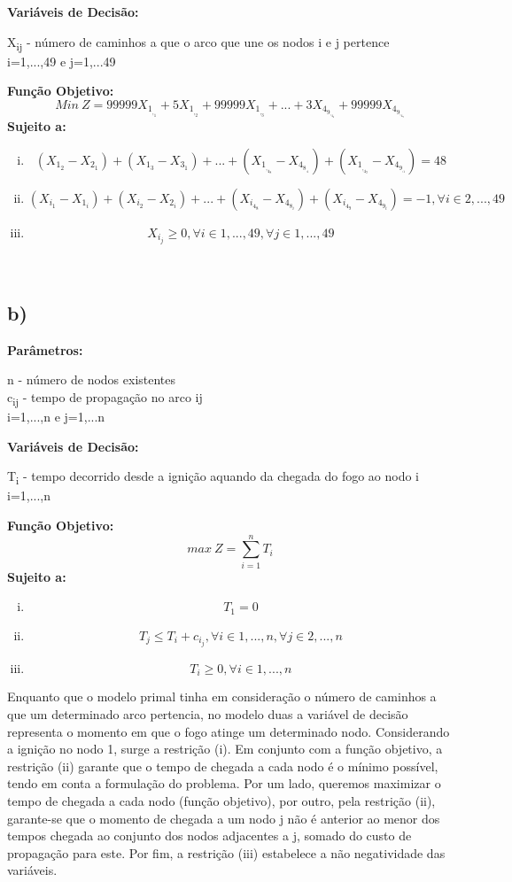 \documentclass[11pt]{article} %
\begin{document}
\textbf{Variáveis de Decisão:} \\
\begin{center}
X\textsubscript{ij} - número de caminhos a que o arco que une os nodos i e j pertence\\
i=1,...,49 e j=1,...49 \\
\end{center}
\textbf{Função Objetivo:}
$$Min \ Z = 99999X_1_,_1 + 5X_1_,_2+99999X_1_,_3+...+3X_4_9_,_4_8+99999X_4_9_,_4_9$$
\textbf{Sujeito a:}
\begin{enumerate}[(i)]
\item $$(X_1_2-X_2_1)+(X_1_3-X_3_1)+...+(X_1_,_4_8-X_4_8_,_1)+(X_1_,_4_9-X_4_9_,_1)=48$$
\item $$(X_i_1-X_1_i)+(X_i_2-X_2_i)+...+(X_i_4_8-X_4_8_i)+(X_i_4_9-X_4_9_i)=-1, \forall i \in 2,...,49 $$
\item $$X_i_j \geq 0, \forall i \in 1,...,49, \forall j \in 1,...,49$$
\end{enumerate}\\

\subsection*{b)}

\textbf{Parâmetros:}
\begin{center}
n - número de nodos existentes \\
c\textsubscript{ij} - tempo de propagação no arco ij\\
i=1,...,n e j=1,...n \\
\end{center}
\textbf{Variáveis de Decisão:} \\
\begin{center}
T\textsubscript{i} - tempo decorrido desde a ignição aquando da chegada do fogo ao nodo i\\
i=1,...,n\\
\end{center}
\textbf{Função Objetivo:}
$$max \ Z = \sum_{i=1}^{n} T_i$$
\textbf{Sujeito a:}
\begin{enumerate}[(i)]
\item $$T_1 = 0$$
\item $$T_j \leq T_i + c_i_j, \forall i \in 1,...,n , \forall j \in 2,...,n$$
\item $$T_i \geq 0, \forall i \in 1,...,n$$
\end{enumerate}

Enquanto que o modelo primal tinha em consideração o número de caminhos a que um determinado arco pertencia, no modelo duas a variável de decisão representa o momento em que o fogo atinge um determinado nodo. Considerando a ignição no nodo 1, surge a restrição (i). Em conjunto com a função objetivo, a restrição (ii) garante que o tempo de chegada a cada nodo é o mínimo possível, tendo em conta a formulação do problema. Por um lado, queremos maximizar o tempo de chegada a cada nodo (função objetivo), por outro, pela restrição (ii), garante-se que o momento de chegada a um nodo j não é anterior ao menor dos tempos chegada ao conjunto dos nodos adjacentes a j, somado do custo de propagação para este. Por fim, a restrição (iii) estabelece a não negatividade das variáveis.
\end{document}
